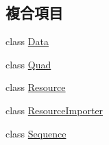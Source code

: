 \subsection*{複合項目}
\begin{DoxyCompactItemize}
\item 
class \hyperlink{class_magnum_1_1_sprite_sheet_1_1_data}{Data}
\item 
class \hyperlink{class_magnum_1_1_sprite_sheet_1_1_quad}{Quad}
\item 
class \hyperlink{class_magnum_1_1_sprite_sheet_1_1_resource}{Resource}
\item 
class \hyperlink{class_magnum_1_1_sprite_sheet_1_1_resource_importer}{Resource\+Importer}
\item 
class \hyperlink{class_magnum_1_1_sprite_sheet_1_1_sequence}{Sequence}
\end{DoxyCompactItemize}
